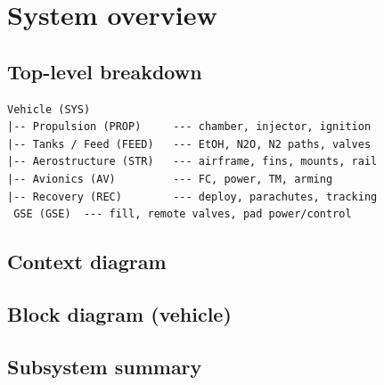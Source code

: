 \section{System overview}
\label{sec:sys-overview}


\subsection{Top-level breakdown}

\begin{verbatim}
Vehicle (SYS)
|-- Propulsion (PROP)     --- chamber, injector, ignition
|-- Tanks / Feed (FEED)   --- EtOH, N2O, N2 paths, valves
|-- Aerostructure (STR)   --- airframe, fins, mounts, rail
|-- Avionics (AV)         --- FC, power, TM, arming
|-- Recovery (REC)        --- deploy, parachutes, tracking
 GSE (GSE)  --- fill, remote valves, pad power/control
\end{verbatim}

\subsection{Context diagram}



\subsection{Block diagram (vehicle)}



\subsection{Subsystem summary}

